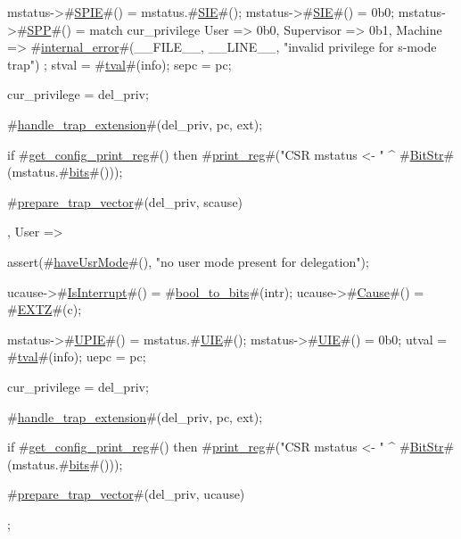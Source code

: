 {{{       mstatus->#\hyperref[sailRISCVzSPIE]{SPIE}#() = mstatus.#\hyperref[sailRISCVzSIE]{SIE}#();
       mstatus->#\hyperref[sailRISCVzSIE]{SIE}#()  = 0b0;
       mstatus->#\hyperref[sailRISCVzSPP]{SPP}#()  = match cur_privilege {
                           User => 0b0,
                           Supervisor => 0b1,
                           Machine => #\hyperref[sailRISCVzinternalzyerror]{internal\_error}#(__FILE__, __LINE__, "invalid privilege for s-mode trap")
                         };
       stval           = #\hyperref[sailRISCVztval]{tval}#(info);
       sepc            = pc;

       cur_privilege   = del_priv;

       #\hyperref[sailRISCVzhandlezytrapzyextension]{handle\_trap\_extension}#(del_priv, pc, ext);

       if   #\hyperref[sailRISCVzgetzyconfigzyprintzyreg]{get\_config\_print\_reg}#()
       then #\hyperref[sailRISCVzprintzyreg]{print\_reg}#("CSR mstatus <- " ^ #\hyperref[sailRISCVzBitStr]{BitStr}#(mstatus.#\hyperref[sailRISCVzbits]{bits}#()));

       #\hyperref[sailRISCVzpreparezytrapzyvector]{prepare\_trap\_vector}#(del_priv, scause)
    },
    User => {
       assert(#\hyperref[sailRISCVzhaveUsrMode]{haveUsrMode}#(), "no user mode present for delegation");

       ucause->#\hyperref[sailRISCVzIsInterrupt]{IsInterrupt}#() = #\hyperref[sailRISCVzboolzytozybits]{bool\_to\_bits}#(intr);
       ucause->#\hyperref[sailRISCVzCause]{Cause}#()       = #\hyperref[sailRISCVzEXTZ]{EXTZ}#(c);

       mstatus->#\hyperref[sailRISCVzUPIE]{UPIE}#() = mstatus.#\hyperref[sailRISCVzUIE]{UIE}#();
       mstatus->#\hyperref[sailRISCVzUIE]{UIE}#()  = 0b0;
       utval           = #\hyperref[sailRISCVztval]{tval}#(info);
       uepc            = pc;

       cur_privilege   = del_priv;

       #\hyperref[sailRISCVzhandlezytrapzyextension]{handle\_trap\_extension}#(del_priv, pc, ext);

       if   #\hyperref[sailRISCVzgetzyconfigzyprintzyreg]{get\_config\_print\_reg}#()
       then #\hyperref[sailRISCVzprintzyreg]{print\_reg}#("CSR mstatus <- " ^ #\hyperref[sailRISCVzBitStr]{BitStr}#(mstatus.#\hyperref[sailRISCVzbits]{bits}#()));

       #\hyperref[sailRISCVzpreparezytrapzyvector]{prepare\_trap\_vector}#(del_priv, ucause)
    }
  };
}
